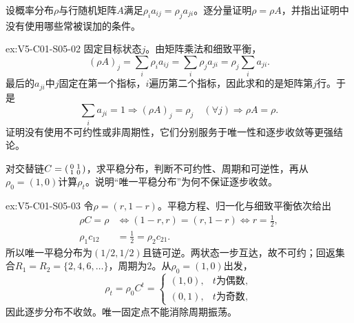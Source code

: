 \begin{SLChapterExercisePairSection}
\begin{exercise}\label{ex:V5-C01-S05-02}
设概率分布$\rho$与行随机矩阵$A$满足$\rho_i a_{ij}=\rho_j a_{ji}$。逐分量证明$\rho=\rho A$，并指出证明中没有使用哪些常被误加的条件。
\end{exercise}
\ifSLFullEdition
{}\label{sol:V5-C01-S05-02}
\begin{chapterexercisesolution}{ex:V5-C01-S05-02}
固定目标状态$j$。由矩阵乘法和细致平衡，
\[
(\rho A)_j=\sum_i\rho_i a_{ij}
=\sum_i\rho_j a_{ji}
=\rho_j\sum_i a_{ji}.
\]
最后的$a_{ji}$中$j$固定在第一个指标，$i$遍历第二个指标，因此求和的是矩阵第$j$行。于是
\[
\sum_i a_{ji}=1
\Longrightarrow (\rho A)_j=\rho_j\quad(\forall j)
\Longrightarrow \rho A=\rho.
\]
证明没有使用不可约性或非周期性，它们分别服务于唯一性和逐步收敛等更强结论。
\end{chapterexercisesolution}
\fi

\begin{exercise}\label{ex:V5-C01-S05-03}
对交替链$C=\begin{psmallmatrix}0&1\\1&0\end{psmallmatrix}$，求平稳分布，判断不可约性、周期和可逆性，再从$\rho_0=(1,0)$计算$\rho_t$。说明“唯一平稳分布”为何不保证逐步收敛。
\end{exercise}
\ifSLFullEdition
{}\label{sol:V5-C01-S05-03}
\begin{chapterexercisesolution}{ex:V5-C01-S05-03}
令$\rho=(r,1-r)$。平稳方程、归一化与细致平衡依次给出
\[
\begin{aligned}
\rho C=\rho&\Longleftrightarrow(1-r,r)=(r,1-r)
\Longleftrightarrow r=\frac12,\\
\rho_1c_{12}&=\frac12=\rho_2c_{21}.
\end{aligned}
\]
所以唯一平稳分布为$(1/2,1/2)$且链可逆。两状态一步互达，故不可约；回返集合$R_1=R_2=\{2,4,6,\ldots\}$，周期为$2$。从$\rho_0=(1,0)$出发，
\[
\rho_t=\rho_0C^t=
\begin{cases}(1,0),&t\text{为偶数},\\(0,1),&t\text{为奇数},\end{cases}
\]
因此逐步分布不收敛。唯一固定点不能消除周期振荡。
\end{chapterexercisesolution}
\fi


\end{SLChapterExercisePairSection}
